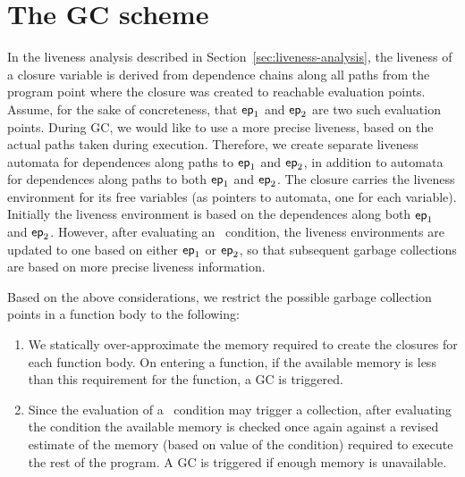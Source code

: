 \documentclass[9pt,nonatbib]{sigplanconf}
\begin{document}
\section{The GC scheme}
\label{sec:GC-scheme}

In        the       liveness        analysis       described        in
Section~\ref{sec:liveness-analysis},   the  liveness   of  a   closure
variable is  derived from dependence  chains along all paths  from the
program point  where the closure  was created to  reachable evaluation
points.  Assume,  for the  sake of  concreteness, that  $\mathsf{ep}_1$ and
$\mathsf{ep}_2$ are two such evaluation points.  During GC,
we would like to use a more precise liveness, based on the actual paths
taken  during  execution.   Therefore,   we  create  separate  liveness
automata for dependences  along paths to $\mathsf{ep}_1$  and $\mathsf{ep}_2$, in
addition to  automata for dependences  along paths to  both $\mathsf{ep}_1$
and $\mathsf{ep}_2$.  The closure carries  the liveness environment for its
free  variables (as  pointers  to automata,  one  for each  variable).
Initially the liveness  environment is based on  the dependences along
both  $\mathsf{ep}_1$   and  $\mathsf{ep}_2$.   However,  after   evaluating  an
\SIF\ condition, the liveness environments are updated to one based on
either   $\mathsf{ep}_1$  or   $\mathsf{ep}_2$,  so   that  subsequent   garbage
collections are based on more precise liveness information.

Based on  the above considerations,  we restrict the  possible garbage
collection points in a function body to the following:
\begin{enumerate}
\item We  statically over-approximate the memory required  to create
  the closures for each function body.  On entering a function, if the
  available memory is  less than this requirement for  the function, a
  GC is triggered.
\item Since the evaluation of a  \SIF\ condition may trigger a 
  collection, after evaluating the condition   the available memory
  is  checked once  again against  a  revised estimate  of the  memory
  (based on  value of the condition)  required to execute the  rest of
  the program.  A GC is triggered if enough memory is unavailable.
\end{enumerate}



\end{document}
